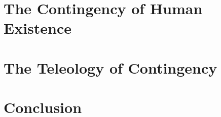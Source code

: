 

\chapter{The Contingency of Human Existence}

% 

\chapter{The Teleology of Contingency}


\chapter{Conclusion}
